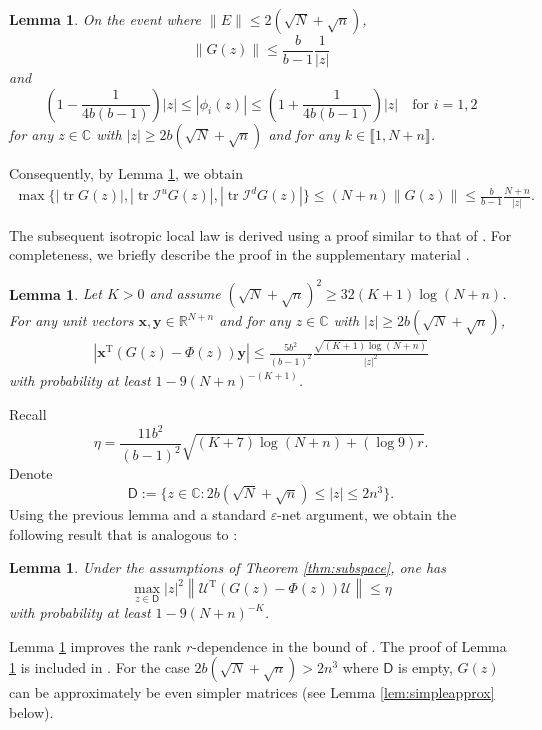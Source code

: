 \documentclass[reqno]{amsart}
\DeclareMathOperator{\tr}{tr}
\newcommand{\T}{\mathrm{T}}
\theoremstyle{plain}
\newtheorem{lemma}[theorem]{Lemma}
\theoremstyle{definition}
\begin{document}
\begin{lemma} \label{lemma:resolventnorm}
On the event where $\|E \| \leq 2 (\sqrt{N}+\sqrt{n})$,
\[ \| G(z) \| \leq \frac{b}{b-1}\frac{1}{|z|}\]%
and
\begin{equation}\label{eq:phibd}
\left(1-\frac{1}{4b(b-1)}\right) |z| \le |\phi_i(z)| \le \left(1+\frac{1}{4b(b-1)}\right) |z| \quad\text{for } i=1,2
\end{equation}
for any $z \in \mathbb{C}$ with $|z| \geq 2b (\sqrt{N}+\sqrt{n})$ and for any $k \in \llbracket 1,N+n \rrbracket$.  
\end{lemma}
Consequently, by Lemma \ref{lemma:resolventnorm}, we obtain
\begin{align}\label{eq:bdontrace}
\max\{|\tr G(z )|, |\tr \mathcal I^u G(z)  |, |\tr \mathcal I^d G(z)  |\}  \le (N+n)\|G(z)\| \le \frac{b}{b-1}\frac{N+n}{|z|}.
\end{align}


The subsequent isotropic local law is derived using a proof similar to that of \cite[Lemma 27]{OVW22}. For completeness, we briefly describe the proof in  the supplementary material \cite{WangSupp24}.
\begin{lemma}\label{lem:iso}Let $K>0$ and assume $(\sqrt N + \sqrt n)^2 \ge 32 (K+1)\log(N+n)$. For any unit vectors $\mathbf x, \mathbf y\in \mathbb{R}^{N+n}$ and for any $z \in \mathbb{C}$ with $|z| \ge 2b(\sqrt{N}+ \sqrt{n})$, 
\begin{align}\label{eq:quadlocal}
\left| \mathbf x^\T \left(G(z)-\Phi(z) \right) \mathbf y\right| \le \frac{5b^2}{(b-1)^2}\frac{  \sqrt{(K+1)\log (N+n)}}{ |z|^2}
\end{align}
with probability at least $1 - 9(N+n)^{-(K+1)}$.  
\end{lemma}

Recall $$\eta=\frac{11 b^2}{(b-1)^2} \sqrt{(K+7)\log (N+n)+(\log 9) r}.$$
Denote $$\mathsf D:= \{ z\in \mathbb C : 2b(\sqrt N + \sqrt n)\le |z| \le 2n^3\}.$$ Using the previous lemma and a standard $\varepsilon$-net argument, we obtain the following result that is analogous to \cite[Lemma 9]{OVW22}:
 \begin{lemma} \label{lem:betterbd}
Under the assumptions of Theorem \ref{thm:subspace}, one has
\[ \max_{ z \in \mathsf D} |z|^2 \left\|  \mathcal U^\T \left(G(z)-\Phi(z) \right) \mathcal U \right\| \leq \eta \] 
with probability at least $1 - 9(N+n)^{-K}$.
\end{lemma}
Lemma \ref{lem:betterbd} improves the rank $r$-dependence in the bound of \cite[Lemma 9]{OVW22}. The proof of Lemma \ref{lem:betterbd} is included in \cite{WangSupp24}. For the case $2b(\sqrt N + \sqrt n)> 2n^3$ where $\mathsf D$ is empty, $G(z)$ can be approximately be even simpler matrices (see Lemma \ref{lem:simpleapprox} below). 
\end{document}
